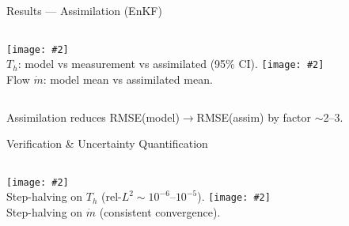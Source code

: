 \documentclass[aspectratio=169]{beamer}
\newcommand{\img}[2][]{\texttt{[image: \#2]}}
\begin{document}
\begin{frame}{Results — Assimilation (EnKF)}
\begin{columns}[T,onlytextwidth]
\img[0.98]{assets/fig_enkf_dynamic_Normal_Th.png}\\[-0.2em]
\footnotesize $T_h$: model vs measurement vs assimilated (95\% CI).
\img[0.98]{assets/fig_enkf_dynamic_Normal_mdot.png}\\[-0.2em]
\footnotesize Flow $\dot m$: model mean vs assimilated mean.
\end{columns}
\medskip
\footnotesize Assimilation reduces RMSE(model)$\rightarrow$RMSE(assim) by factor $\sim$2--3.
\end{frame}

\begin{frame}{Verification \& Uncertainty Quantification}
\begin{columns}[T,onlytextwidth]
\img[0.98]{assets/fig_verification_dynamic_Th.png}\\[-0.2em]
\footnotesize Step-halving on $T_h$ (rel-$L^2\sim10^{-6}$–$10^{-5}$).
\img[0.98]{assets/fig_verification_dynamic_mdot.png}\\[-0.2em]
\footnotesize Step-halving on $\dot m$ (consistent convergence).
\end{columns}
\end{frame}
\end{document}
